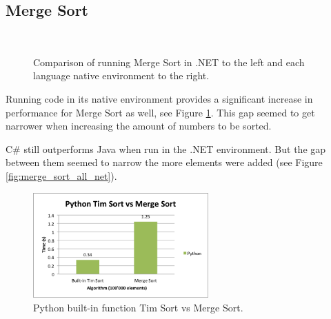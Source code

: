 \subsection{Merge Sort}

\begin{figure}[h]
	\centering
	\mbox{
	}
	\caption{Comparison of running Merge Sort in .NET to the left and each language native environment to the right.}
	\label{fig:merge_sort_net_native}
\end{figure}


Running code in its native environment provides a significant increase in performance for Merge Sort as well, see Figure \ref{fig:merge_sort_net_native}. This gap seemed to get narrower when increasing the amount of numbers to be sorted.

C\# still outperforms Java when run in the .NET environment. But the gap between them seemed to narrow the more elements were added (see Figure \ref{fig:merge_sort_all_net}). 

\begin{figure}[h]
	\centering
	\includegraphics[width=0.6\textwidth]{chapters/media/tim_sort.png}
	\caption{Python built-in function Tim Sort vs Merge Sort.}
	\label{fig:tim_sort}
\end{figure}

